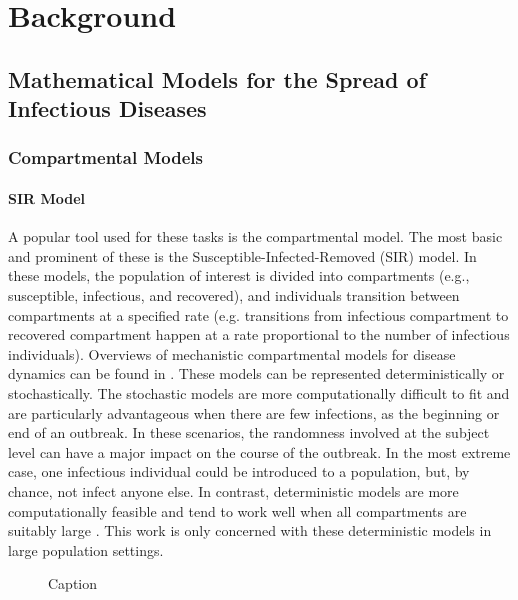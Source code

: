 \chapter{Background}
\label{ch:background}

\section{Mathematical Models for the Spread of Infectious Diseases}
\label{sec:math_models}
\subsection{Compartmental Models}

\subsubsection{SIR Model}


A popular tool used for these tasks is the compartmental model.
The most basic and prominent of these is the Susceptible-Infected-Removed (SIR) model.
In these models, the population of interest is divided into compartments (e.g., susceptible, infectious, and recovered), and individuals transition between compartments at a specified rate (e.g. transitions from infectious compartment to recovered compartment happen at a rate proportional to the number of infectious individuals).
Overviews of mechanistic compartmental models for disease dynamics can be found in \citep{anderson1992infectious, Brauer2008, keeling2011modeling, 10.1093/aje/kww021}.
These models can be represented deterministically or stochastically.
The stochastic models are more computationally difficult to fit and are particularly advantageous when there are few infections, as the beginning or end of an outbreak.
In these scenarios, the randomness involved at the subject level can have a major impact on the course of the outbreak.
In the most extreme case, one infectious individual could be introduced to a population, but, by chance, not infect anyone else.
In contrast, deterministic models are more computationally feasible and tend to work well when all compartments are suitably large \citep{doi:10.1098/rspb.2015.0347}.
This work is only concerned with these deterministic models in large population settings.

\begin{figure}
    \centering
    \caption{Caption}
    \label{fig:SIR_diagram}
\end{figure}


